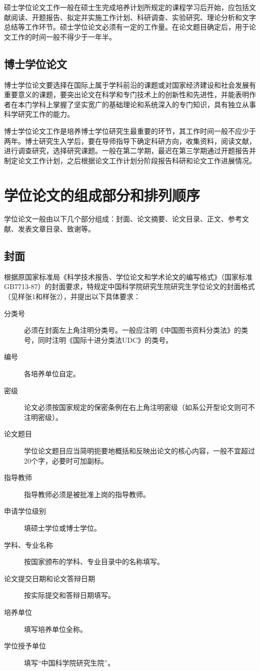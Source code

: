 \documentclass[a4paper,12pt,oneside,openany]{book}
\begin{document}
\begin{CJK}{UTF8}{hei}
硕士学位论文工作一般在硕士生完成培养计划所规定的课程学习后开始，应包括文献阅读、开题报告、拟定并实施工作计划、科研调查、实验研究、理论分析和文字总结等工作环节。硕士学位论文必须有一定的工作量。在论文题目确定后，用于论文工作的时间一般不得少于一年半。


\subsection{博士学位论文}

博士学位论文要选择在国际上属于学科前沿的课题或对国家经济建设和社会发展有重要意义的课题，要突出论文在科学和专门技术上的创新性和先进性，并能表明作者在本门学科上掌握了坚实宽广的基础理论和系统深入的专门知识，具有独立从事科学研究工作的能力。

博士学位论文工作是培养博士学位研究生最重要的环节，其工作时间一般不应少于两年。博士研究生入学后，要在导师指导下确定科研方向，收集资料，阅读文献，进行调查研究，选择研究课题。一般在第二学期，最迟在第三学期通过开题报告并制定论文工作计划，之后根据论文工作计划分阶段报告科研和论文工作进展情况。


\section{学位论文的组成部分和排列顺序}

学位论文一般由以下几个部分组成：封面、论文摘要、论文目录、正文、参考文献、发表文章目录、致谢等。


\subsection{封面}

根据原国家标准局《科学技术报告、学位论文和学术论文的编写格式》（国家标准GB7713-87）的封面要求，特规定中国科学院研究生院研究生学位论文的封面格式（见样张1和样张2），并提出以下具体要求：
\begin{description}
\item [{分类号}] 必须在封面左上角注明分类号。一般应注明《中国图书资料分类法》的类号，同时注明《国际十进分类法UDC》的类号。
\item [{编号}] 各培养单位自定。
\item [{密级}] 论文必须按国家规定的保密条例在右上角注明密级（如系公开型论文则可不注明密级）。
\item [{论文题目}] 学位论文题目应当简明扼要地概括和反映出论文的核心内容，一般不宜超过20个字，必要时可加副标。
\item [{指导教师}] 指导教师必须是被批准上岗的指导教师。
\item [{申请学位级别}] 填硕士学位或博士学位。
\item [{学科、专业名称}] 按国家颁布的学科、专业目录中的名称填写。
\item [{论文提交日期和论文答辩日期}] 按实际提交和答辩日期填写。
\item [{培养单位}] 填写培养单位全称。
\item [{学位授予单位}] 填写“中国科学院研究生院”。
\end{description}


\end{CJK}
\end{document}
